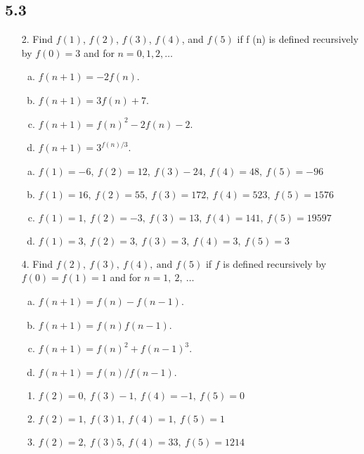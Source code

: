 \subsection{5.3}
\begin{itemize}
    \item[2.]  Find $f(1)$, $f(2)$, $f(3)$, $f(4)$, and $f(5)$ if f (n) is defined
          recursively by $f(0) = 3$ and for $n = 0, 1, 2, \ldots$
          \begin{enumerate}[a.]
              \item $f (n + 1) = -2f (n)$.
              \item $f (n + 1) = 3f (n) + 7$.
              \item $f (n + 1) = f (n)^2 - 2f (n) - 2$.
              \item $f (n + 1) = 3^{f(n)/3}$.
          \end{enumerate}
          \answer
          \begin{enumerate}[a.]
              \item $f(1)=-6, \ f(2)=12, \ f(3) -24, \ f(4) = 48, \ f(5) = -96$
              \item $f(1)=16, \ f(2)=55, \ f(3)= 172 , \ f(4) = 523, \ f(5) = 1576$
              \item $f(1)=1,  \ f(2)=-3, \ f(3)= 13, \ f(4) = 141, \ f(5) = 19597$
              \item $f(1)=3,  \ f(2)=3, \ f(3) =3, \ f(4) = 3, \ f(5) = 3$
          \end{enumerate}
    \item[4.]  Find $f(2),\ f (3),\ f (4),\ \text{and } f (5)$ if $f$ is defined recursively by $f (0) = f (1) = 1$ and for $n = 1,\ 2,\ \ldots$
          \begin{enumerate}[a.]
              \item $f (n + 1) = f (n) - f (n - 1)$.
              \item $f (n + 1) = f (n)f (n - 1)$.
              \item $f (n + 1) = f (n)^2 + f (n - 1)^3 $.
              \item $f (n + 1) = f (n)/f (n - 1)$.
          \end{enumerate}
          \answer
          \begin{enumerate}
              \item $f(2)=0, \ f(3) -1, \ f(4) = -1, \ f(5) = 0$
              \item $f(2)=1, \ f(3) 1, \ f(4) = 1, \ f(5) = 1$
              \item $f(2)=2, \ f(3) 5, \ f(4) = 33, \ f(5) = 1214$

\end{enumerate}
\end{itemize}
